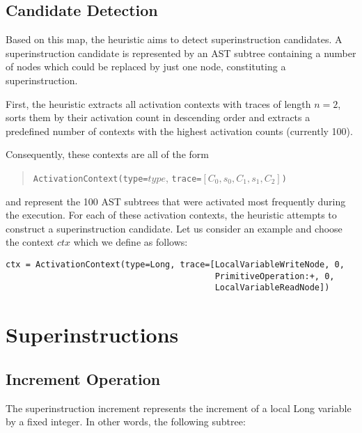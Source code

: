 \documentclass[10pt,a4paper]{article}
\newcommand{\sinst}[1]{\textsf{#1}}
\begin{document}
\subsection{Candidate Detection}

Based on this map, the heuristic aims to detect superinstruction candidates. A superinstruction candidate is represented by an AST subtree containing a number of nodes which could be replaced by just one node, constituting a superinstruction.

First, the heuristic extracts all activation contexts with traces of length $n = 2$, sorts them by their activation count in descending order and extracts a predefined number of contexts with the highest activation counts (currently 100).

Consequently, these contexts are all of the form

\begin{quotation}
\verb|ActivationContext(type=|$type$, \verb|trace=|$[C_0, s_0, C_1, s_1, C_2]$\verb|)|
\end{quotation}
and represent the 100 AST subtrees that were activated most frequently during the execution. For each of these activation contexts, the heuristic attempts to construct a superinstruction candidate. Let us consider an example and choose the context $ctx$ which we define as follows:

\begin{verbatim}
ctx = ActivationContext(type=Long, trace=[LocalVariableWriteNode, 0,
                                          PrimitiveOperation:+, 0,
                                          LocalVariableReadNode])
\end{verbatim}


\section{Superinstructions}\label{sec:superinst}

\subsection{Increment Operation}

The superinstruction \sinst{increment} represents the increment of a local \textsf{Long} variable by a fixed integer.
In other words, the following subtree:
\end{document}
